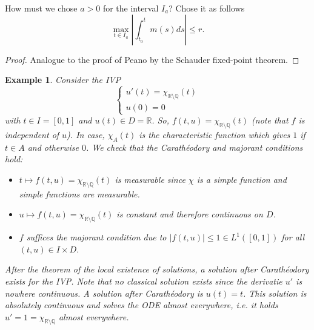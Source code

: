 \documentclass[a4paper, 11pt]{article}
\newtheorem*{example}{Example}
\begin{document}
How must we chose $a > 0$ for the interval $I_a$? Chose it as follows
\[
\max_{t \in I_a} |\int^t_{t_0}m(s) ds| \leq r.
\]

\begin{proof}
	Analogue to the proof of Peano by the Schauder fixed-point theorem.
\end{proof}

\begin{example}
	Consider the IVP
	\[
	\begin{cases}
	u'(t) = \chi_{\mathbb R \setminus \mathbb Q}(t) \\
	u(0) = 0
	\end{cases}
	\]
	with $t \in I = [0,1]$ and $u(t) \in  D= \mathbb R$. So, $f (t,u) = \chi_{\mathbb R \setminus \mathbb Q}(t)$ (note that $f$ is independent of $u$). In case, $\chi_A(t)$ is the characteristic function which gives $1$ if $t \in A$ and otherwise $0$. We check that the Carathéodory and majorant conditions hold:
	\begin{itemize}
		\item $t \mapsto f(t,u) = \chi_{\mathbb R \setminus \mathbb Q}(t)$ is measurable since $\chi$ is a simple function and simple functions are measurable.
		
		\item $u \mapsto f(t,u) = \chi_{\mathbb R \setminus \mathbb Q}(t)$ is constant and therefore continuous on $D$. 
		
		\item $f$ suffices the majorant condition due to $|f(t,u)| \leq 1 \in L^1([0,1])$ for all $(t,u) \in I \times D$.
	\end{itemize}
	After the theorem of the local existence of solutions, a solution after Carathéodory exists for the IVP. Note that no classical solution exists since the derivatie $u'$ is nowhere continuous. A solution after Carathéodory is $u(t) = t$. This solution is absolutely continuous and solves the ODE almost everywhere, i.e. it holds $u' = 1 = \chi_{\mathbb R \setminus \mathbb Q}$ almost everywhere.
\end{example}
\end{document}
